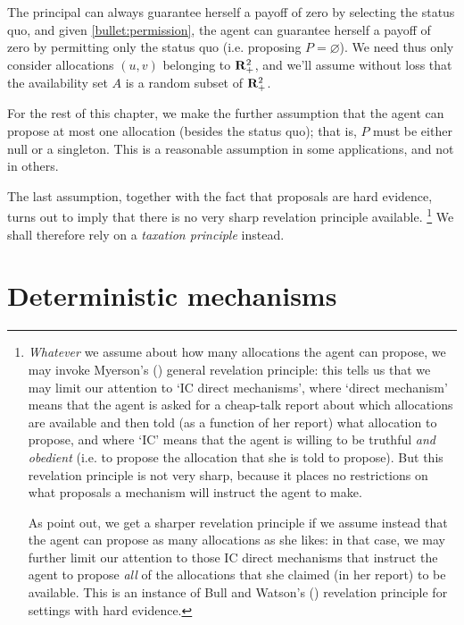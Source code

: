 The principal can always guarantee herself a payoff of zero by selecting the status quo,
and given \ref{bullet:permission}, the agent can guarantee herself a payoff of zero by permitting only the status quo (i.e. proposing $P = \varnothing$).
We need thus only consider allocations $(u,v)$ belonging to $\mathbf{R}_+^2$,
and we'll assume without loss that the availability set $A$ is a random subset of $\mathbf{R}_+^2$.

For the rest of this chapter, we make the further assumption that the agent can propose at most one allocation (besides the status quo); that is, $P$ must be either null or a singleton.
This is a reasonable assumption in some applications, and not in others.

The last assumption, together with the fact that proposals are hard evidence, turns out to imply that there is no very sharp revelation principle available.%
	\footnote{\emph{Whatever} we assume about how many allocations the agent can propose,
	we may invoke Myerson's (\citeyear{Myerson1982}) general revelation principle:
	this tells us that we may limit our attention to
	`IC direct mechanisms',
	where `direct mechanism' means that the agent is asked for a cheap-talk report about which allocations are available
	and then told (as a function of her report) what allocation to propose,
	and where `IC' means that the agent
	is willing to be truthful
	\emph{and obedient} (i.e. to propose the allocation that she is told to propose).
	But this revelation principle is not very sharp,
	because it places no restrictions on what proposals a mechanism will instruct the agent to make.

	As \textcite{GuoShmaya2022} point out,
	we get a sharper revelation principle if we assume instead that the agent can propose as many allocations as she likes:
	in that case, we may further limit our attention to those IC direct mechanisms that instruct the agent to propose \emph{all} of the allocations that she claimed (in her report) to be available.
	This is an instance of Bull and Watson's (\citeyear{BullWatson2007}) revelation principle for settings with hard evidence.}
We shall therefore rely on a \emph{taxation principle} instead.



\section{Deterministic mechanisms}
\label{sec:ch4:deterministic}


